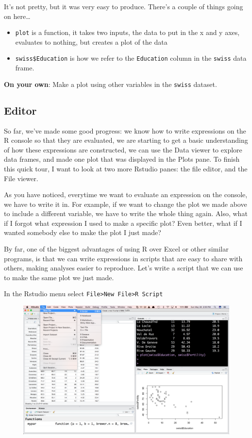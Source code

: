 \documentclass[12pt,]{book}
\theoremstyle{definition}
\theoremstyle{definition}
\theoremstyle{remark}
\begin{document}
It's not pretty, but it was very easy to produce. There's a couple of
things going on here\ldots{}

\begin{itemize}
\item
  \texttt{plot} is a function, it takes two inputs, the data to put in
  the x and y axes, evaluates to nothing, but creates a plot of the data
\item
  \texttt{swiss\$Education} is how we refer to the \texttt{Education}
  column in the \texttt{swiss} data frame.
\end{itemize}

\textbf{On your own}: Make a plot using other variables in the
\texttt{swiss} dataset.

\subsection{Editor}\label{editor}

So far, we've made some good progress: we know how to write expressions
on the R console so that they are evaluated, we are starting to get a
basic understanding of how these expressions are constructed, we can use
the Data viewer to explore data frames, and made one plot that was
displayed in the Plots pane. To finish this quick tour, I want to look
at two more Rstudio panes: the file editor, and the File viewer.

As you have noticed, everytime we want to evaluate an expression on the
console, we have to write it in. For example, if we want to change the
plot we made above to include a different variable, we have to write the
whole thing again. Also, what if I forgot what expression I used to make
a specific plot? Even better, what if I wanted somebody else to make the
plot I just made?

By far, one of the biggest advantages of using R over Excel or other
similar programs, is that we can write expressions in scripts that are
easy to share with others, making analyses easier to reproduce. Let's
write a script that we can use to make the same plot we just made.

In the Rstudio menu select
\texttt{File\textgreater{}New\ File\textgreater{}R\ Script}

\begin{figure}
\centering
\includegraphics{img/rstudio_new_script.png}
\caption{}
\end{figure}
\end{document}
